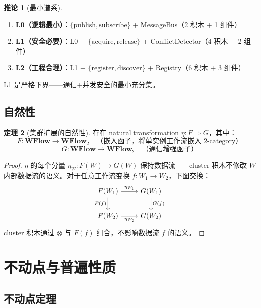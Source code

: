 \documentclass[11pt,a4paper]{article}
\theoremstyle{definition}
\newtheorem{theorem}{定理}[section]
\newtheorem{corollary}[theorem]{推论}
\theoremstyle{definition}
\theoremstyle{remark}
\newcommand{\cat}[1]{\mathbf{#1}}
\newcommand{\catWFlow}{\cat{WFlow}}
\newcommand{\functor}[3]{#1: #2 \to #3}
\newcommand{\natarrow}{\Rightarrow}
\newcommand{\tensor}{\otimes}
\begin{document}
\begin{corollary}[最小谱系]
\begin{enumerate}[leftmargin=2em,label=L\arabic*:]
    \item \textbf{L0（逻辑最小）}：$\{\mathrm{publish}, \mathrm{subscribe}\}$ + MessageBus（2 积木 + 1 组件）
    \item \textbf{L1（安全必要）}：L0 + $\{\mathrm{acquire}, \mathrm{release}\}$ + ConflictDetector（4 积木 + 2 组件）
    \item \textbf{L2（工程合理）}：L1 + $\{\mathrm{register}, \mathrm{discover}\}$ + Registry（6 积木 + 3 组件）
\end{enumerate}
L1 是严格下界——通信+并发安全的最小充分集。
\end{corollary}

\subsection{自然性}

\begin{theorem}[集群扩展的自然性]
存在 natural transformation $\eta: F \natarrow G$，其中：
\[
\functor{F}{\catWFlow}{\catWFlow_2} \quad\text{（嵌入函子，将单实例工作流嵌入 2-category）}
\]
\[
\functor{G}{\catWFlow}{\catWFlow_2} \quad\text{（通信增强函子）}
\]
\label{thm:cluster-naturality}
\end{theorem}

\begin{proof}
$\eta$ 的每个分量 $\eta_W: F(W) \to G(W)$ 保持数据流——cluster 积木不修改 $W$ 内部数据流的语义。对于任意工作流变换 $f: W_1 \to W_2$，下图交换：
\[
\begin{tikzcd}
F(W_1) \arrow[r, "\eta_{W_1}"] \arrow[d, "F(f)"'] & G(W_1) \arrow[d, "G(f)"] \\
F(W_2) \arrow[r, "\eta_{W_2}"'] & G(W_2)
\end{tikzcd}
\]
cluster 积木通过 $\tensor$ 与 $F(f)$ 组合，不影响数据流 $f$ 的语义。
\end{proof}

\section{不动点与普遍性质}

\subsection{不动点定理}
\end{document}
